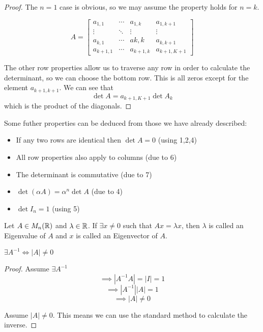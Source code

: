 \documentclass[a4paper,10pt]{article}
\begin{document}
\begin{proof}
The $n=1$ case is obvious, so we may assume the property holds for
$n=k$.

\[
	A =
	\begin{bmatrix}
		a_{1,1}   & \cdots & a_{1,k}   & a_{1,k+1} \\
		\vdots    & \ddots & \vdots    & \vdots    \\
		a_{k,1}   & \cdots & a{k,k}    & a_{k,k+1} \\
		a_{k+1,1} & \cdots & a_{k+1,k} & a_{k+1,K+1}
	\end{bmatrix}
\]

The other row properties allow us to traverse any row in order to
calculate the determinant, so we can choose the bottom row. This is all
zeros except for the element $a_{k+1,k+1}$. We can see that
\[
	\det A = a_{k+1,K+1} \det A_k
\]
which is the product of the diagonals.
\end{proof}

Some futher properties can be deduced from those we have already described:
\begin{itemize}
	\item
		If any two rows are identical then $\det A = 0$ (using 1,2,4)
	\item
		All row properties also apply to columns (due to 6)
	\item
		The determinant is commutative (due to 7)
	\item
		$\det(\alpha A) = \alpha^n \det A$ (due to 4)
	\item
		$\det I_n = 1$ (using 5)
\end{itemize}

\begin{defn}
	Let $A \in M_n(\mathbb{R})$ and $\lambda \in \mathbb{R}$. If $\exists x \neq
	0$ such that $Ax = \lambda x$, then $\lambda$ is called an
	Eigenvalue of $A$ and $x$ is called an Eigenvector of $A$.
\end{defn}

\begin{lemma}
	$\exists A^{-1} \iff |A| \neq 0$
\end{lemma}

\begin{proof}
	Assume $\exists A^{-1}$
	\[ \implies |A^{-1}A| = |I| = 1 \]
	\[ \implies |A^{-1}||A| = 1 \]
	\[ \implies |A| \neq 0 \]

	Assume $|A| \neq 0$. This means we can use the standard method
	to calculate the inverse.
\end{proof}
\end{document}
